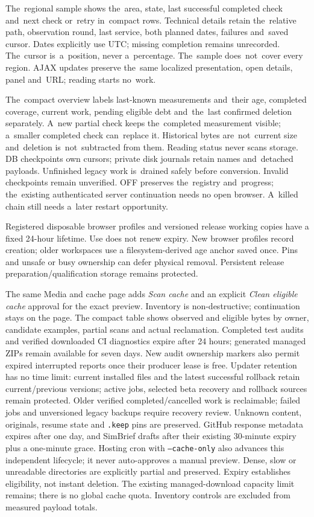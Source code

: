 \documentclass[11pt,a4paper]{article}
\begin{document}
The~regional sample shows the~area, state, last successful completed check
and~next check or~retry in~compact rows. Technical details retain the~relative
path, observation round, last service, both planned dates, failures and~saved
cursor. Dates explicitly use UTC; missing completion remains unrecorded.
The~cursor is~a~position, never a~percentage. The~sample does~not~cover every
region. AJAX updates preserve the~same localized presentation, open details,
panel and~URL; reading starts no~work.

The~compact overview labels last-known measurements and~their age, completed
coverage, current work, pending eligible debt and~the~last confirmed deletion
separately. A~new partial check keeps the~completed measurement visible;
a~smaller completed check can~replace it. Historical bytes are~not~current size
and~deletion is~not~subtracted from them. Reading status never scans storage. DB
checkpoints own cursors; private disk journals retain names and~detached
payloads. Unfinished legacy work is~drained safely before conversion. Invalid
checkpoints remain unverified. OFF preserves the~registry and~progress;
the~existing authenticated server continuation needs no open browser. A~killed
chain still needs a~later restart opportunity.

Registered disposable browser profiles and versioned release working copies have
a fixed 24-hour lifetime. Use does not renew expiry. New browser profiles record
creation; older workspaces use a filesystem-derived age anchor saved once.
Pins and unsafe or busy ownership can defer physical removal. Persistent release
preparation/qualification storage remains protected.

The same Media and cache page adds \emph{Scan cache} and an explicit
\emph{Clean eligible cache} approval for the exact preview. Inventory is
non-destructive; continuation stays on the page. The compact table shows
observed
and eligible bytes by owner, candidate examples, partial scans and actual
reclamation. Completed test audits and verified downloaded CI diagnostics expire
after 24 hours; generated managed ZIPs remain available for seven days. New
audit
ownership markers also permit expired interrupted reports once their producer
lease is free. Updater retention has no time limit: current installed files and
the latest successful rollback retain current/previous versions; active jobs,
selected beta recovery and rollback sources remain protected. Older verified
completed/cancelled work is reclaimable; failed jobs and unversioned legacy
backups require recovery review. Unknown content, originals, resume state and
\texttt{.keep} pins are preserved. GitHub response metadata expires after one
day,
and SimBrief drafts after their existing 30-minute expiry plus a one-minute
grace.
Hosting cron with \texttt{--cache-only} also advances this independent
lifecycle;
it never auto-approves a manual preview. Dense, slow or unreadable directories
are explicitly partial and preserved. Expiry establishes eligibility, not
instant
deletion. The existing managed-download capacity limit remains; there is no
global
cache quota. Inventory controls are excluded from measured payload totals.
\end{document}
